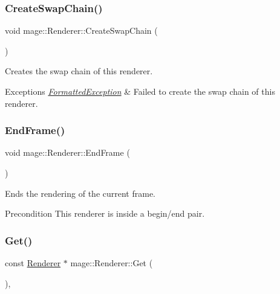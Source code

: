\subsubsection{\texorpdfstring{Create\+Swap\+Chain()}{CreateSwapChain()}}
{\footnotesize\ttfamily void mage\+::\+Renderer\+::\+Create\+Swap\+Chain (\begin{DoxyParamCaption}{ }\end{DoxyParamCaption})\hspace{0.3cm}{\ttfamily [private]}}

Creates the swap chain of this renderer.


\begin{DoxyExceptions}{Exceptions}
{\em \hyperlink{structmage_1_1_formatted_exception}{Formatted\+Exception}} & Failed to create the swap chain of this renderer. \\
\hline
\end{DoxyExceptions}
\hypertarget{classmage_1_1_renderer_ac4b5290432db9c566c1accd98c311e0e}{}\label{classmage_1_1_renderer_ac4b5290432db9c566c1accd98c311e0e} 
\subsubsection{\texorpdfstring{End\+Frame()}{EndFrame()}}
{\footnotesize\ttfamily void mage\+::\+Renderer\+::\+End\+Frame (\begin{DoxyParamCaption}{ }\end{DoxyParamCaption})\hspace{0.3cm}{\ttfamily [noexcept]}}

Ends the rendering of the current frame.

\begin{DoxyPrecond}{Precondition}
This renderer is inside a begin/end pair. 
\end{DoxyPrecond}
\hypertarget{classmage_1_1_renderer_a84ad465ae4ecfa2c0e9334cadb82d269}{}\label{classmage_1_1_renderer_a84ad465ae4ecfa2c0e9334cadb82d269} 
\subsubsection{\texorpdfstring{Get()}{Get()}}
{\footnotesize\ttfamily const \hyperlink{classmage_1_1_renderer}{Renderer} $\ast$ mage\+::\+Renderer\+::\+Get (\begin{DoxyParamCaption}{ }\end{DoxyParamCaption})\hspace{0.3cm}{\ttfamily [static]}, {\ttfamily [noexcept]}}

